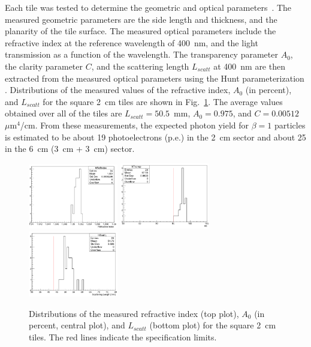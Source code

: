 \documentclass[5p,times,twocolumn]{elsarticle}
\begin{document}
Each tile was tested to determine the geometric and optical parameters~\cite{REF:RICH2016mc}. The measured
geometric parameters are the side length and thickness, and the planarity of the tile surface. The measured optical
parameters include the refractive index at the reference wavelength of 400~nm, and the light transmission as a
function of the wavelength. The transparency parameter $A_0$, the clarity parameter $C$, and the scattering length
$L_{scatt}$ at 400~nm are then extracted from the measured optical parameters using the Hunt parameterization
\cite{REF:Hunt}. Distributions of the measured values of the refractive index, $A_0$ (in percent), and $L_{scatt}$ for the
square 2~cm tiles are shown in Fig.~\ref{Fig:Aerogel_2cm}. The average values obtained over all of the tiles are
$L_{scatt} = 50.5$~mm, $A_0 = 0.975$, and $C = 0.00512$~$\mu$m$^4$/cm. From these measurements, the expected
photon yield for $\beta=1$ particles is estimated to be about 19 photoelectrons (p.e.) in the 2~cm sector and about 25
in the 6~cm (3~cm + 3~cm) sector.

\begin{figure}
\begin{center}
\includegraphics[width=0.35\textwidth]{AeroRefInd_2cm.pdf}
\includegraphics[width=0.35\textwidth]{AeroA0_2cm.pdf}
\includegraphics[width=0.35\textwidth]{AeroLscatt_2cm.pdf}
\caption{Distributions of the measured refractive index (top plot), $A_0$ (in percent, central plot), and $L_{scatt}$
  (bottom plot) for the square 2~cm tiles. The red lines indicate the specification limits.}
\label{Fig:Aerogel_2cm}
\end{center}
\end{figure}
\end{document}
